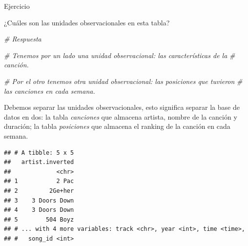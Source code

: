\documentclass[]{article}
\newenvironment{Shaded}{\begin{snugshade}}{\end{snugshade}}
\newcommand{\KeywordTok}[1]{\textcolor[rgb]{0.13,0.29,0.53}{\textbf{#1}}}
\newcommand{\DataTypeTok}[1]{\textcolor[rgb]{0.13,0.29,0.53}{#1}}
\newcommand{\DecValTok}[1]{\textcolor[rgb]{0.00,0.00,0.81}{#1}}
\newcommand{\StringTok}[1]{\textcolor[rgb]{0.31,0.60,0.02}{#1}}
\newcommand{\CommentTok}[1]{\textcolor[rgb]{0.56,0.35,0.01}{\textit{#1}}}
\newcommand{\OperatorTok}[1]{\textcolor[rgb]{0.81,0.36,0.00}{\textbf{#1}}}
\newcommand{\NormalTok}[1]{#1}
\begin{document}
\begin{bclogo}[
  couleur=llred,
  arrondi=0,
  logo=\bcstop,
  barre=none,
  noborder=true]{Ejercicio}
  
¿Cuáles son las unidades observacionales en esta tabla?
\end{bclogo}

\begin{Shaded}
\begin{Highlighting}[]
\CommentTok{# Respuesta}

\CommentTok{# Tenemos por un lado una unidad observacional: las características de la}
\CommentTok{# canción.}

\CommentTok{# Por el otro tenemos otra unidad observacional: las posiciones que tuvieron }
\CommentTok{# las canciones en cada semana.}
\end{Highlighting}
\end{Shaded}

Debemos separar las unidades observacionales, esto significa separar la
base de datos en dos: la tabla \emph{canciones} que almacena artista,
nombre de la canción y duración; la tabla \emph{posiciones} que almacena
el ranking de la canción en cada semana.

\begin{Shaded}
\end{Shaded}

\begin{verbatim}
## # A tibble: 5 x 5
##   artist.inverted
##             <chr>
## 1           2 Pac
## 2         2Ge+her
## 3    3 Doors Down
## 4    3 Doors Down
## 5        504 Boyz
## # ... with 4 more variables: track <chr>, year <int>, time <time>,
## #   song_id <int>
\end{verbatim}

\begin{Shaded}
\end{Shaded}
\end{document}

